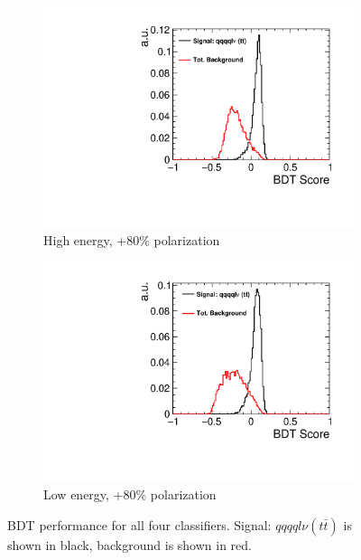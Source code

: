 \begin{figure}[ht]\ContinuedFloat 
  \begin{subfigure}[b]{0.5\linewidth}
    \centering
    \includegraphics[width=0.99\linewidth]{TopAnalysis/figures/BDTScoreHighEPos.pdf} 
    \caption{High energy, +80\% polarization} 
    \vspace{4ex}
  \end{subfigure}%
  \begin{subfigure}[b]{0.5\linewidth}
    \centering
    \includegraphics[width=0.99\linewidth]{TopAnalysis/figures/BDTScoreLowEPos.pdf} 
    \caption{Low energy, +80\% polarization} 
    \vspace{4ex}
  \end{subfigure}
  \caption[\ac{BDT} performance for all four classifiers]{\ac{BDT} performance for all four classifiers. Signal: $qqqql\nu (t\bar{t})$ is shown in black, background is shown in red.}
  \label{fig:topbdtscores}
\end{figure}

